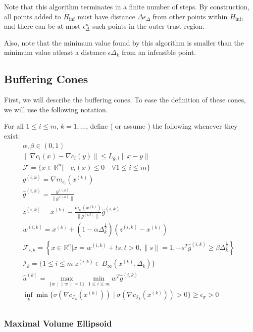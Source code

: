 \documentclass{article}
\theoremstyle{case}
\newcommand{\dk}{\Delta_k}
\newcommand{\xk}{{x^{(k)}}}
\newcommand{\gik}{{g^{(i, k)}}}
\newcommand{\hgik}{{{\hat g}^{(i, k)}}}
\newcommand{\zik}{{z^{(i, k)}}}
\newcommand{\fik}{{\mathcal F_{i, k}}}
\newcommand{\iik}{{\mathcal I_{k}}}
\newcommand{\huk}{{{\hat u}^{(k)}}}
\newcommand{\rn}{{\mathbb R^{n}}}
\newcommand{\wik}{{w^{(i, k)}}}
\newcommand{\f}{{\mathcal F}}
\newcommand{\lgi}{{L_{g, i}}}
\begin{document}
Note that this algorithm terminates in a finite number of steps.
By construction, all points added to $H_{\text{inf}}$ must have distance $\Delta  \epsilon_{\Delta}$ from other points within $H_{\text{inf}}$,
and there can be at most $\epsilon_{\Delta}^n$ such points in the outer trust region.

Also, note that the minimum value found by this algorithm is smaller than the minimum value atleast a distance $\epsilon \Delta_k$ from an infeasible point.



\subsection{Buffering Cones}

First, we will describe the buffering cones.
To ease the definition of these cones, we will use the following notation.


For all $1 \le i \le m$, $k = 1, \ldots$, define (\color{red} or assume \color{black}) the following whenever they exist:
\begin{align}
\alpha, \beta \in (0, 1) \label{def_alpha_beta} \\
\|\nabla c_i(x) - \nabla c_i(y)\| \le \lgi \|x - y\| \label{def_lipshitz} \\
\f = \{x \in \rn | \quad c_i(x) \le 0\quad \forall 1 \le i \le m \} \label{def_feasible} \\
\gik = \nabla m_{c_i}(\xk) \label{def_g} \\
\hgik = \frac{\gik}{\|\gik\|} \label{def_gk} \\
\zik = \xk - \frac{m_{c_i}(\xk)}{\|\gik\|}\hgik \label{def_z} \\
\wik = \xk + \left(1 - \alpha\dk^{\frac 1 2}\right)\left(\zik - \xk\right) \label{def_w} \\
\fik = \left\{x \in \rn | x = \wik + t s,t > 0, \|s\| = 1, -s^T\hgik \ge \beta \dk^{\frac 1 2 }\right\} \label{def_f} \\
\iik = \{1\le i \le m | \zik \in B_{\infty}(\xk, \dk) \} \label{def_i} \\
\huk = \max_{\{w \; | \; \|w\| = 1\}} \min_{1\le i\le m} w^T \hgik\label{def_hu} \\
\inf_{k}\min\{\sigma(\nabla c_{\mathcal I_k}(\xk)) \; | \; \sigma(\nabla c_{\mathcal I_k}(\xk)) > 0 \} \ge \epsilon_{\sigma} > 0\\
\end{align}


\subsubsection{Maximal Volume Ellipsoid}
\end{document}
